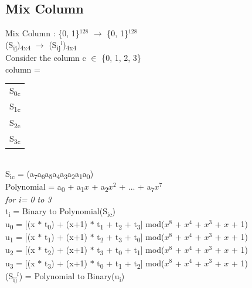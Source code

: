 \documentclass[11pt]{article}
\begin{document}
	\subsection{Mix Column}
	Mix Column : \{0, 1\}$^{128}$ $\rightarrow$ \{0, 1\}$^{128}$\vspace{0.2cm}\\
	(S\textsubscript{ij})\textsubscript{4x4} $\rightarrow$ (S\textsubscript{ij}$^l$)\textsubscript{4x4}\\
	Consider the column c $\in$ \{0, 1, 2, 3\}\vspace{0.2cm}\\
	column = \begin{tabular}{|c|}
		S\textsubscript{0c}\\
		S\textsubscript{1c}\\
		S\textsubscript{2c}\\
		S\textsubscript{3c}
	\end{tabular}\vspace{0.2cm}\\
	S\textsubscript{ic} = (a\textsubscript{7}a\textsubscript{6}a\textsubscript{5}a\textsubscript{4}a\textsubscript{3}a\textsubscript{2}a\textsubscript{1}a\textsubscript{0})\\
	Polynomial = a\textsubscript{0} + a\textsubscript{1}$x$ + a\textsubscript{2}$x^2$ + ... + a\textsubscript{7}$x^7$\vspace{0.2cm}\\
	\textit{for i= 0 to 3}\\
	\hspace*{1cm}t\textsubscript{i} = Binary to Polynomial(S\textsubscript{ic})\\
	u\textsubscript{0} = [(x $\ast$ t\textsubscript{0}) + (x+1) $\ast$ t\textsubscript{1} + t\textsubscript{2} + t\textsubscript{3}] mod($x^8$ + $x^4$ + $x^3$ + $x$ + 1)\\
	u\textsubscript{1} = [(x $\ast$ t\textsubscript{1}) + (x+1) $\ast$ t\textsubscript{2} + t\textsubscript{3} + t\textsubscript{0}] mod($x^8$ + $x^4$ + $x^3$ + $x$ + 1)\\
	u\textsubscript{2} = [(x $\ast$ t\textsubscript{2}) + (x+1) $\ast$ t\textsubscript{3} + t\textsubscript{0} + t\textsubscript{1}] mod($x^8$ + $x^4$ + $x^3$ + $x$ + 1)\\
	u\textsubscript{3} = [(x $\ast$ t\textsubscript{3}) + (x+1) $\ast$ t\textsubscript{0} + t\textsubscript{1} + t\textsubscript{2}] mod($x^8$ + $x^4$ + $x^3$ + $x$ + 1)\\
	(S\textsubscript{ij}$^l$) = Polynomial to Binary(u\textsubscript{i})\vspace{0.2cm}\\
\end{document}
